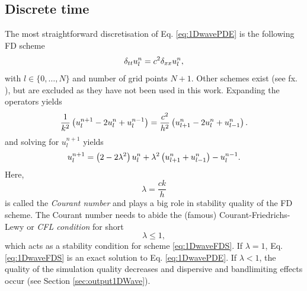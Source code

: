 \subsection{Discrete time}
The most straightforward discretisation of Eq. \eqref{eq:1DwavePDE} is the following FD scheme
\begin{equation}\label{eq:1DwaveFDS}
    \delta_{tt} u_l^n = c^2 \delta_{xx} u_l^n,
\end{equation}
with $l\in\{0, \hdots, N\}$ and number of grid points $N + 1$.
Other schemes exist (see fx. \cite{theBible}), but are excluded as they have not been used in this work. Expanding the operators yields
\begin{equation}
    \frac{1}{k^2}\left(u_l^{n+1}-2 u_l^n + u_l^{n-1}\right) = \frac{c^2}{h^2} \left(u_{l+1}^n - 2 u_l^n + u_{l-1}^n\right).
\end{equation}
and solving for $u_l^{n+1}$ yields
\begin{equation}\label{eq:1DwaveUpdate}
    u_l^{n+1} = \left(2-2\lambda^2\right) u_l^n  + \lambda^2\left(u_{l+1}^n + u_{l-1}^n\right) - u_l^{n-1}.
\end{equation}
Here, 
\begin{equation}
    \lambda = \frac{ck}{h}
\end{equation}
is called the \textit{Courant number} and plays a big role in stability quality of the FD scheme. The Courant number needs to abide the (famous) Courant-Friedrichs-Lewy or \textit{CFL condition} for short \cite{Courant1928}
\begin{equation}\label{eq:CFL}
    \lambda \leq 1,
\end{equation}
which acts as a stability condition for scheme \eqref{eq:1DwaveFDS}.
If $\lambda = 1$, Eq. \eqref{eq:1DwaveFDS} is an exact solution to Eq. \eqref{eq:1DwavePDE}.  If $\lambda < 1$, the quality of the simulation quality decreases and dispersive and bandlimiting effects occur (see Section \ref{sec:output1DWave}).

